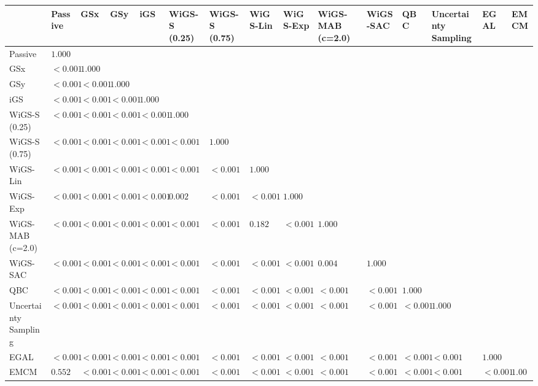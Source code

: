 \begin{tabular}{lllllllllllllll}
\toprule
 & Passive & GSx & GSy & iGS & WiGS-S (0.25) & WiGS-S (0.75) & WiGS-Lin & WiGS-Exp & WiGS-MAB (c=2.0) & WiGS-SAC & QBC & Uncertainty Sampling & EGAL & EMCM \\
\midrule
Passive & $1.000$ &  &  &  &  &  &  &  &  &  &  &  &  &  \\
GSx & $<0.001$ & $1.000$ &  &  &  &  &  &  &  &  &  &  &  &  \\
GSy & $<0.001$ & $<0.001$ & $1.000$ &  &  &  &  &  &  &  &  &  &  &  \\
iGS & $<0.001$ & $<0.001$ & $<0.001$ & $1.000$ &  &  &  &  &  &  &  &  &  &  \\
WiGS-S (0.25) & $<0.001$ & $<0.001$ & $<0.001$ & $<0.001$ & $1.000$ &  &  &  &  &  &  &  &  &  \\
WiGS-S (0.75) & $<0.001$ & $<0.001$ & $<0.001$ & $<0.001$ & $<0.001$ & $1.000$ &  &  &  &  &  &  &  &  \\
WiGS-Lin & $<0.001$ & $<0.001$ & $<0.001$ & $<0.001$ & $<0.001$ & $<0.001$ & $1.000$ &  &  &  &  &  &  &  \\
WiGS-Exp & $<0.001$ & $<0.001$ & $<0.001$ & $<0.001$ & $0.002$ & $<0.001$ & $<0.001$ & $1.000$ &  &  &  &  &  &  \\
WiGS-MAB (c=2.0) & $<0.001$ & $<0.001$ & $<0.001$ & $<0.001$ & $<0.001$ & $<0.001$ & $0.182$ & $<0.001$ & $1.000$ &  &  &  &  &  \\
WiGS-SAC & $<0.001$ & $<0.001$ & $<0.001$ & $<0.001$ & $<0.001$ & $<0.001$ & $<0.001$ & $<0.001$ & $0.004$ & $1.000$ &  &  &  &  \\
QBC & $<0.001$ & $<0.001$ & $<0.001$ & $<0.001$ & $<0.001$ & $<0.001$ & $<0.001$ & $<0.001$ & $<0.001$ & $<0.001$ & $1.000$ &  &  &  \\
Uncertainty Sampling & $<0.001$ & $<0.001$ & $<0.001$ & $<0.001$ & $<0.001$ & $<0.001$ & $<0.001$ & $<0.001$ & $<0.001$ & $<0.001$ & $<0.001$ & $1.000$ &  &  \\
EGAL & $<0.001$ & $<0.001$ & $<0.001$ & $<0.001$ & $<0.001$ & $<0.001$ & $<0.001$ & $<0.001$ & $<0.001$ & $<0.001$ & $<0.001$ & $<0.001$ & $1.000$ &  \\
EMCM & $0.552$ & $<0.001$ & $<0.001$ & $<0.001$ & $<0.001$ & $<0.001$ & $<0.001$ & $<0.001$ & $<0.001$ & $<0.001$ & $<0.001$ & $<0.001$ & $<0.001$ & $1.000$ \\
\bottomrule
\end{tabular}
